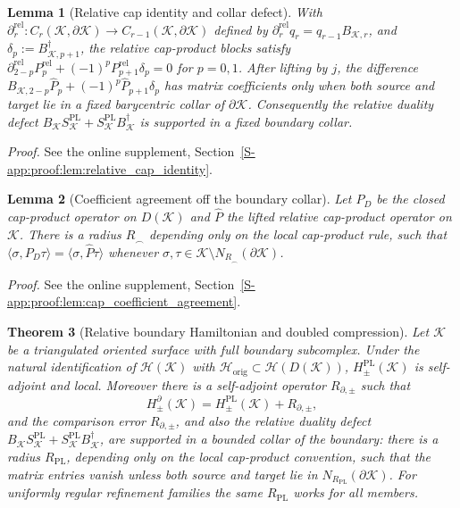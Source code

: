 \documentclass[11pt]{article}
\numberwithin{equation}{section}
\newtheorem{theorem}{Theorem}[section]
\newtheorem{lemma}[theorem]{Lemma}
\theoremstyle{definition}
\theoremstyle{remark}
\newcommand{\proofsuppref}[1]{%
  \par\noindent\emph{Proof.} See the online supplement, Section~\ref{S-#1}.\par\medskip
}
\newcommand{\K}{\mathcal{K}}
\newcommand{\Hil}{\mathcal{H}}
\newcommand{\bd}{\partial}
\begin{document}
\begin{lemma}[Relative cap identity and collar defect]\label{lem:relative_cap_identity}
With $\partial^{\mathrm{rel}}_r:C_r(\K,\bd\K)\to C_{r-1}(\K,\bd\K)$ defined by
$\partial^{\mathrm{rel}}_r q_r=q_{r-1}B_{\K,r}$, and $\delta_p:=B_{\K,p+1}^\dagger$, the
relative cap-product blocks satisfy
$\partial^{\mathrm{rel}}_{2-p}P^{\mathrm{rel}}_p+(-1)^p P^{\mathrm{rel}}_{p+1}\delta_p=0$
for $p=0,1$. After lifting by $j$, the difference
\(B_{\K,2-p}\widehat P_p+(-1)^p\widehat P_{p+1}\delta_p\) has matrix coefficients only when
both source and target lie in a fixed barycentric collar of $\bd\K$. Consequently the relative
duality defect $B_\K S^{\mathrm{PL}}_\K+S^{\mathrm{PL}}_\K B_\K^\dagger$ is supported in a fixed
boundary collar.
\end{lemma}
\proofsuppref{app:proof:lem:relative_cap_identity}

\begin{lemma}[Coefficient agreement off the boundary collar]\label{lem:cap_coefficient_agreement}
Let $P_D$ be the closed cap-product operator on $D(\K)$ and $\widehat P$ the lifted relative
cap-product operator on $\K$. There is a radius $R_\frown$ depending only on the local
cap-product rule, such that
$\langle\sigma,P_D\tau\rangle=\langle\sigma,\widehat P\tau\rangle$ whenever
$\sigma,\tau\in\K\setminus N_{R_\frown}(\bd\K)$.
\end{lemma}
\proofsuppref{app:proof:lem:cap_coefficient_agreement}

\begin{theorem}[Relative boundary Hamiltonian and doubled compression]\label{thm:relative_boundary_comparison}
Let \(\K\) be a triangulated oriented surface with full boundary subcomplex. Under the natural
identification of \(\Hil(\K)\) with \(\Hil_{\mathrm{orig}}\subset\Hil(D(\K))\),
\(H^{\mathrm{PL}}_{\pm}(\K)\) is self-adjoint and local. Moreover there is a self-adjoint operator
\(R_{\partial,\pm}\) such that
\begin{equation}\label{eq:relative_boundary_comparison}
H_{\pm}^{\bd}(\K)
=
H^{\mathrm{PL}}_{\pm}(\K)+R_{\partial,\pm},
\end{equation}
and the comparison error \(R_{\partial,\pm}\), and also the relative duality defect
\(B_\K S^{\mathrm{PL}}_\K+S^{\mathrm{PL}}_\K B_\K^\dagger\), are supported in a bounded collar of
the boundary: there is a radius \(R_{\mathrm{PL}}\), depending only on the local cap-product
convention, such that the matrix entries vanish unless both source and target lie in
\(N_{R_{\mathrm{PL}}}(\bd\K)\). For uniformly regular refinement families the same
\(R_{\mathrm{PL}}\) works for all members.
\end{theorem}
\end{document}
